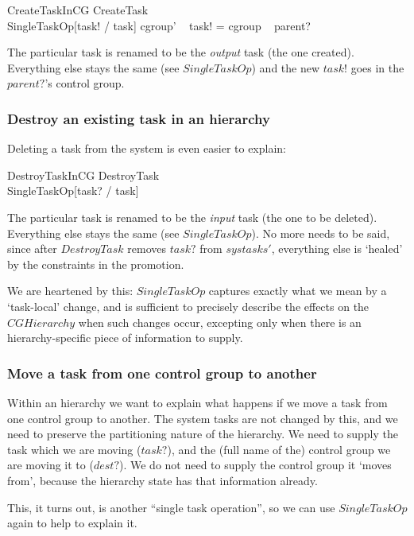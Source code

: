 \documentclass[a4paper,twoside,12pt]{article}
\begin{document}
\begin{schema}{CreateTaskInCG}
CreateTask \\
SingleTaskOp[task! / task]
\where
cgroup' ~ task! = cgroup ~ parent?
\end{schema}
The particular task is renamed to be the \emph{output} task (the one created). 
Everything else stays the same (see $SingleTaskOp$) and the new $task!$ goes in the $parent?$'s control group.

\subsubsection{Destroy an existing task in an hierarchy}

Deleting a task from the system is even easier to explain:

\begin{schema}{DestroyTaskInCG}
DestroyTask \\
SingleTaskOp[task? / task]
\end{schema}
The particular task is renamed to be the \emph{input} task (the one to be deleted).
Everything else stays the same (see $SingleTaskOp$). 
No more needs to be said, since after $DestroyTask$ removes $task?$ from $systasks'$, 
everything else is `healed' by the constraints in the promotion.

We are heartened by this: $SingleTaskOp$ captures exactly what we mean by a `task-local' change,
and is sufficient to precisely describe the effects on the $CGHierarchy$ when such changes occur, excepting only 
when there is
an hierarchy-specific piece of information to supply.

\subsubsection{Move a task from one control group to another}

Within an hierarchy we want to explain what happens if we move a task from one control group to another.
The system tasks are not changed by this, and we need to preserve the partitioning nature of the hierarchy. 
We need to supply the task which we are moving ($task?$), 
and the (full name of the) control group we are moving it to ($dest?$). 
We do not need to supply the control group it `moves from', because the hierarchy state has that information already.

This, it turns out, is another ``single task operation'', so we can use $SingleTaskOp$ again to help to explain it.
\end{document}
